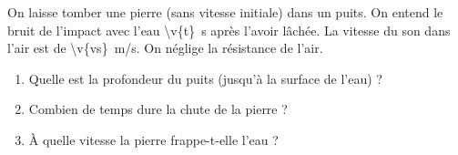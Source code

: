 On laisse tomber une pierre (sans vitesse initiale) dans un puits. On entend le bruit de l'impact avec l'eau \qty{\v{t}}{s} après l'avoir lâchée. La vitesse du son dans l'air est de \qty{\v{vs}}{m/s}. On néglige la résistance de l'air.

\begin{enumerate}[label=\alph*)]
    \item Quelle est la profondeur du puits (jusqu'à la surface de l'eau) ?
    \item Combien de temps dure la chute de la pierre ?
    \item À quelle vitesse la pierre frappe-t-elle l'eau ?
\end{enumerate}
